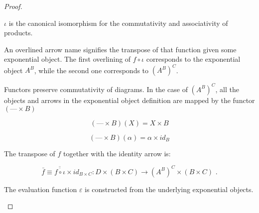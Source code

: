 \documentclass[a4paper,notitlepage]{article}
\begin{document}
\begin{enumerate}
\begin{enumerate}
\begin{proof}
\begin{description}

      $\iota$ is the canonical isomorphism for the commutativity and
      associativity of products. 

      An overlined arrow name signifies the transpose of that function
      given some exponential object. The first overlining of $f \circ ι$ corresponds to the
      exponential object $A^B$, while the second one corresponds to
      $(A^B)^C$.

      Functors preserve commutativity of diagrams.
      In the case of $\left ( A^B \right )^C$, all the objects and arrows in the
      exponential object definition are mapped by the functor $(— \times B)$

      $$(— \times B)(X) = X \times B$$

      $$(— \times B)(α) = α \times id_B$$

      The transpose of $f$ together with the identity arrow is:

      \begin{equation*}
      \bar{f} \equiv \overline{\overline{f \circ \iota}} \times id_{B\times C} :
               D × (B × C) → \left (A^B \right )^C \times (B \times C)\text{ .}
      \end{equation*}
      
      The evaluation function $ε$ is constructed from the underlying
      exponential objects.


\end{description}
\end{proof}
\end{enumerate}
\end{enumerate}
\end{document}
